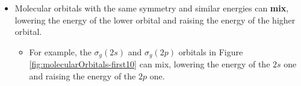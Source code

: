 \documentclass[../notes.tex]{subfiles}
\begin{document}
\begin{itemize}
\begin{itemize}
    \end{itemize}
    \item Molecular orbitals with the same symmetry and similar energies can \textbf{mix}, lowering the energy of the lower orbital and raising the energy of the higher orbital.
    \begin{itemize}
        \item For example, the $\sigma_g(2s)$ and $\sigma_g(2p)$ orbitals in Figure \ref{fig:molecularOrbitals-first10} can mix, lowering the energy of the $2s$ one and raising the energy of the $2p$ one.
    \end{itemize}
\end{itemize}
\end{document}
